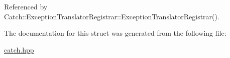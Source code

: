 Referenced by Catch\-::\-Exception\-Translator\-Registrar\-::\-Exception\-Translator\-Registrar().



The documentation for this struct was generated from the following file\-:\begin{DoxyCompactItemize}
\item 
\hyperlink{catch_8hpp}{catch.\-hpp}\end{DoxyCompactItemize}
